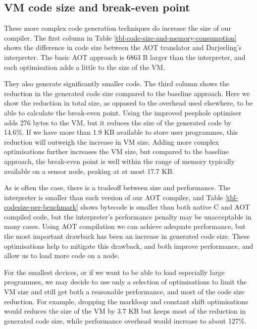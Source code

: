 \subsection{VM code size and break-even point}
These more complex code generation techniques do increase the size of our compiler. The first column in Table \ref{tbl-code-size-and-memory-consumption} shows the difference in code size between the AOT translator and Darjeeling's interpreter. The basic AOT approach is 6863 B larger than the interpreter, and each optimisation adds a little to the size of the VM.

They also generate significantly smaller code. The third column shows the reduction in the generated code size compared to the baseline approach. Here we show the reduction in total size, as opposed to the overhead used elsewhere, to be able to calculate the break-even point. Using the improved peephole optimiser adds 276 bytes to the VM, but it reduces the size of the generated code by 14.6\%. If we have more than 1.9 KB available to store user programmes, this reduction will outweigh the increase in VM size. Adding more complex optimisations further increases the VM size, but compared to the baseline approach, the break-even point is well within the range of memory typically available on a sensor node, peaking at at most 17.7 KB.

As is often the case, there is a tradeoff between size and performance. The interpreter is smaller than each version of our AOT compiler, and Table \ref{tbl-codesize-per-benchmark} shows bytecode is smaller than both native C and AOT compiled code, but the interpreter's performance penalty may be unacceptable in many cases. Using AOT compilation we can achieve adequate performance, but the most important drawback has been an increase in generated code size. These optimisations help to mitigate this drawback, and both improve performance, and allow us to load more code on a node.

For the smallest devices, or if we want to be able to load especially large programmes, we may decide to use only a selection of optimisations to limit the VM size and still get both a reasonable performance, and most of the code size reduction. For example, dropping the markloop and constant shift optimisations would reduces the size of the VM by 3.7 KB but keeps most of the reduction in generated code size, while performance overhead would increase to about 127\%.



